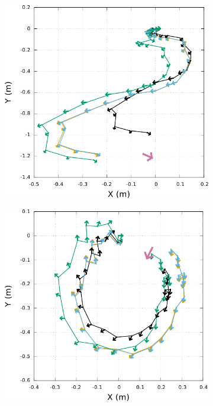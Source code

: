 \begin{figure}[h]
\begin{subfigure}{0.28\paperwidth}
    \end{subfigure}
    \begin{subfigure}{0.28\paperwidth}
        \centering
        \includegraphics[type=pdf,ext=.pdf,read=.pdf,width=1.0\linewidth]{../plot/OdometryCMAES/readsTraj5}
    \end{subfigure}
    \begin{subfigure}{0.28\paperwidth}
        \centering
        \includegraphics[type=pdf,ext=.pdf,read=.pdf,width=1.0\linewidth]{../plot/OdometryCMAES/readsTraj6}

\end{subfigure}
\end{figure}
